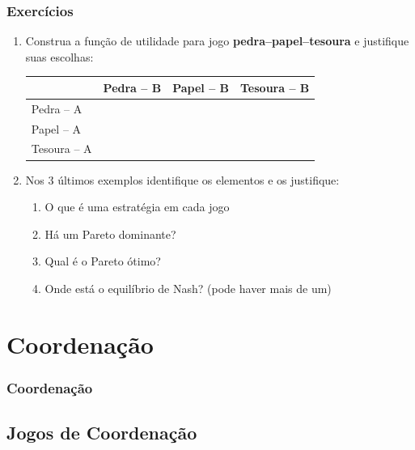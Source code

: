 \begin{frame}
\frametitle{Exercícios}

\begin{enumerate}
  \item Construa a função de utilidade para jogo \textbf{pedra--papel--tesoura} e justifique suas escolhas:
  
    \begin{center}
      \begin{tabular}{l||c|c|c}
                 & Pedra -- B & Papel -- B & Tesoura -- B \\ \hline \hline
      Pedra -- A     &       &     &   \\ \hline
      Papel -- A     &       &       &   \\ \hline
      Tesoura -- A   &       &       &   \\ \hline \hline
      \end{tabular}
    \end{center}


\item Nos 3 últimos exemplos identifique os elementos e os justifique:
\begin{enumerate}
    \item O que é uma estratégia em cada jogo
    \item Há um Pareto dominante?
    \item Qual é o Pareto ótimo?
    \item Onde está o equilíbrio de Nash? (pode haver mais de um)
  \end{enumerate}  
  
\end{enumerate}

\end{frame}


\section{Coordenação}


\begin{frame}
\frametitle{Coordenação}



\end{frame}




\subsection{Jogos de Coordenação}

